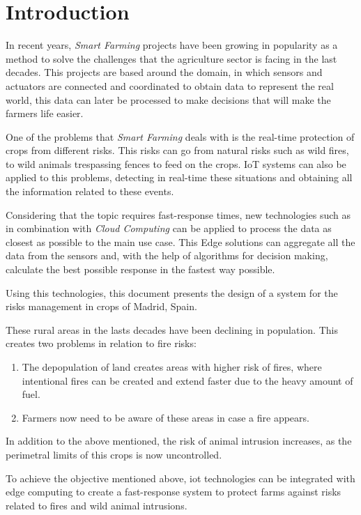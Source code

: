 \section{Introduction}

In recent years, \textit{Smart Farming} projects have been growing in popularity as a method to solve the challenges that the agriculture sector is facing in the last decades. 
This projects are based around the  domain, in which sensors and actuators are connected and coordinated to obtain data to represent the real world, this data can 
later be processed to make decisions that will make the farmers life easier.

One of the problems that \textit{Smart Farming} deals with is the real-time protection of crops from different risks. This risks can go from natural 
risks such as wild fires, to wild animals trespassing fences to feed on the crops. IoT systems can also be applied to this problems, detecting in real-time 
these situations and obtaining all the information related to these events. 

Considering that the topic requires fast-response times, new technologies such as  in combination with \textit{Cloud Computing} can be applied to 
process the data as closest as possible to the main use case. This Edge solutions can aggregate all the data from the sensors and, with the help of 
algorithms for decision making, calculate the best possible response in the fastest way possible.


Using this technologies, this document presents the design of a system for the risks management in crops of Madrid, Spain. 

These rural areas in the lasts decades have been declining in population. This creates two problems in relation to fire risks:
\begin{enumerate}
    \item The depopulation of land creates areas with higher risk of fires\cite{Yanosolo}, where intentional fires can be created and extend faster due to the heavy amount of fuel.
    \item Farmers now need to be aware of these areas in case a fire appears.
\end{enumerate}

In addition to the above mentioned, the risk of animal intrusion increases\cite{importanciacazaEspana}, as the perimetral limits of this crops is now uncontrolled.

To achieve the objective mentioned above, \acrshort{iot} technologies can be integrated with edge computing to create a fast-response system to protect farms against risks related to fires and wild animal intrusions.
